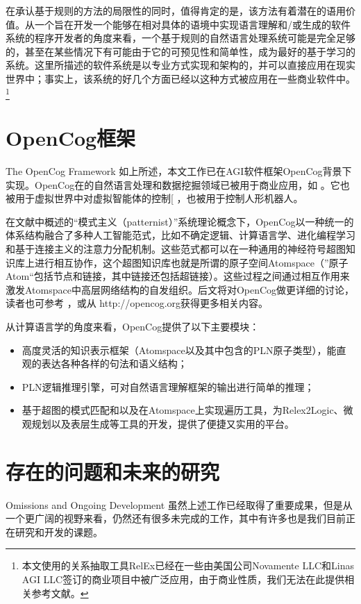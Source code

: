 在承认基于规则的方法的局限性的同时，值得肯定的是，该方法有着潜在的语用价值。从一个旨在开发一个能够在相对具体的语境中实现语言理解和/或生成的软件系统的程序开发者的角度来看，一个基于规则的自然语言处理系统可能是完全足够的，甚至在某些情况下有可能由于它的可预见性和简单性，成为最好的基于学习的系统。这里所描述的软件系统是以专业方式实现和架构的，并可以直接应用在现实世界中；事实上，该系统的好几个方面已经以这种方式被应用在一些商业软件中。\footnote{本文使用的关系抽取工具RelEx已经在一些由美国公司Novamente LLC和Linas AGI LLC签订的商业项目中被广泛应用，由于商业性质，我们无法在此提供相关参考文献。}

\section{OpenCog框架}{The OpenCog Framework}
如上所述，本文工作已在AGI软件框架OpenCog背景下实现。OpenCog在的自然语言处理和数据挖掘领域已被用于商业应用，如 \cite{Goertzel2006}。它也被用于虚拟世界中对虚拟智能体的控制[ \cite{Goertzel2008d}  \cite{Goertzel2011x}，也被用于控制人形机器人\cite{Goertzel2010h}。

在文献\cite{GoertzelHP}中概述的“模式主义（patternist）”系统理论概念下，OpenCog以一种统一的体系结构融合了多种人工智能范式，比如不确定逻辑、计算语言学、进化编程学习和基于连接主义的注意力分配机制。这些范式都可以在一种通用的神经符号超图知识库上进行相互协作，这个超图知识库也就是所谓的原子空间Atomspace（”原子Atom“包括节点和链接，其中链接还包括超链接）。这些过程之间通过相互作用来激发Atomspace中高层网络结构的自发组织。后文将对OpenCog做更详细的讨论，读者也可参考 \cite{Goertzel2010h}，或从 http://opencog.org获得更多相关内容。

从计算语言学的角度来看，OpenCog提供了以下主要模块：
\begin{itemize}
\item 高度灵活的知识表示框架（Atomspace以及其中包含的PLN原子类型），能直观的表达各种各样的句法和语义结构；
\item PLN逻辑推理引擎，可对自然语言理解框架的输出进行简单的推理；
\item 基于超图的模式匹配和以及在Atomspace上实现遍历工具，为Relex2Logic、微观规划以及表层生成等工具的开发，提供了便捷又实用的平台。
\end{itemize}

\section{存在的问题和未来的研究}{Omissions and Ongoing Development}
虽然上述工作已经取得了重要成果，但是从一个更广阔的视野来看，仍然还有很多未完成的工作，其中有许多也是我们目前正在研究和开发的课题。

